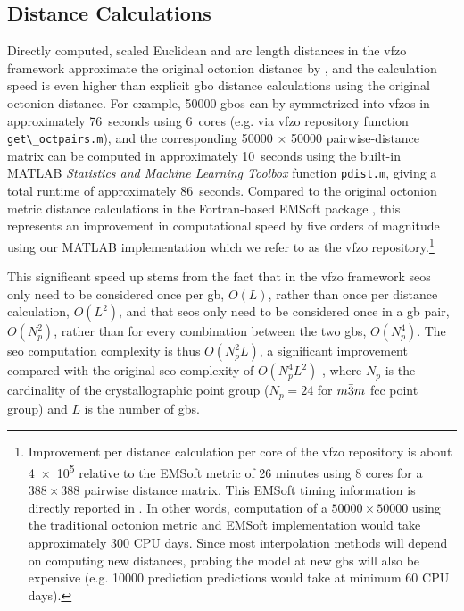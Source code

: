 \documentclass[final,twocolumn,12pt]{elsarticle}
\newcommand{\matlab}[1]{\mbox{\lstinline[style=Matlab-editor]{#1}}}
\newcommand{\outpt}{prediction}
\newcommand{\vfzorepo}{\gls{vfzo} repository}
\newcommand{\symtime}{76}
\begin{document}
\subsection{Distance Calculations}
\label{sec:intro:distancecalculations}
Directly computed, scaled Euclidean and arc length distances in the \gls{vfzo} framework approximate the original octonion distance by \citet{francisGeodesicOctonionMetric2019}, and the calculation speed is even higher than explicit \gls{gbo} distance calculations using the original octonion distance. For example, \num{50000} \glspl{gbo} can by symmetrized into \glspl{vfzo} in approximately \SI{\symtime}{seconds} using \SI{6}{cores} (e.g. via \vfzorepo{} function \matlab{get\_octpairs.m}), and the corresponding \num{50000} $\times$ \num{50000} pairwise-distance matrix can be computed in approximately \SI{10}{seconds} using the built-in MATLAB \textit{Statistics and Machine Learning Toolbox} function \matlab{pdist.m}, giving a total runtime of approximately \SI{86}{seconds}. Compared to the original octonion metric distance calculations \cite{chesserLearningGrainBoundary2020} in the Fortran-based EMSoft package \cite{degraefEMSoft2020}, this represents an improvement in computational speed by five orders of magnitude using our MATLAB implementation \cite{bairdFiveDegreeofFreedom5DOF2020} which we refer to as the \vfzorepo{}.\footnote{Improvement per distance calculation per core of the \vfzorepo{} is about \num{4e5} relative to the EMSoft \cite{degraefEMSoft2020} metric of 26 minutes using 8 cores for a $\num{388}\times\num{388}$ pairwise distance matrix. This EMSoft timing information is directly reported in \cite{chesserLearningGrainBoundary2020}. In other words, computation of a $\num{50000}\times\num{50000}$ using the traditional octonion metric and EMSoft implementation would take approximately 300 CPU days. Since most interpolation methods will depend on computing new distances, probing the model at new \glspl{gb} will also be expensive (e.g. \num{10000} \outpt{} predictions would take at minimum 60 CPU days). } %

This significant speed up stems from the fact that in the \gls{vfzo} framework \glspl{seo} only need to be considered once per \gls{gb}, $O(L)$, rather than once per distance calculation, $O(L^2)$,
and that \glspl{seo} only need to be considered once in a \gls{gb} pair, $O(N_p^2)$, rather than for every combination between the two \glspl{gb}, $O(N_p^4)$. The \gls{seo} computation complexity is thus $O(N_p^2L)$, a significant improvement compared with the original \gls{seo} complexity of $O(N_p^4L^2)$ \cite{chesserLearningGrainBoundary2020}, where $N_p$ is the cardinality of the crystallographic point group ($N_p=24$ for $m\Bar{3}m$ \gls{fcc} point group) and $L$ is the number of \glspl{gb}. 
\end{document}

